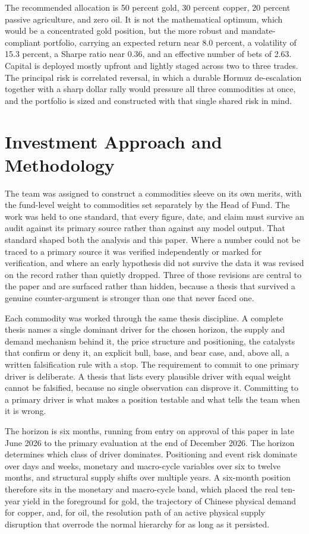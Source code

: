 \documentclass[11pt,a4paper]{article}
\begin{document}
The recommended allocation is 50 percent gold, 30 percent copper, 20 percent passive agriculture, and zero oil. It is not the mathematical optimum, which would be a concentrated gold position, but the more robust and mandate-compliant portfolio, carrying an expected return near 8.0 percent, a volatility of 15.3 percent, a Sharpe ratio near 0.36, and an effective number of bets of 2.63. Capital is deployed mostly upfront and lightly staged across two to three trades. The principal risk is correlated reversal, in which a durable Hormuz de-escalation together with a sharp dollar rally would pressure all three commodities at once, and the portfolio is sized and constructed with that single shared risk in mind.

\section{Investment Approach and Methodology}

The team was assigned to construct a commodities sleeve on its own merits, with the fund-level weight to commodities set separately by the Head of Fund. The work was held to one standard, that every figure, date, and claim must survive an audit against its primary source rather than against any model output. That standard shaped both the analysis and this paper. Where a number could not be traced to a primary source it was verified independently or marked for verification, and where an early hypothesis did not survive the data it was revised on the record rather than quietly dropped. Three of those revisions are central to the paper and are surfaced rather than hidden, because a thesis that survived a genuine counter-argument is stronger than one that never faced one.

Each commodity was worked through the same thesis discipline. A complete thesis names a single dominant driver for the chosen horizon, the supply and demand mechanism behind it, the price structure and positioning, the catalysts that confirm or deny it, an explicit bull, base, and bear case, and, above all, a written falsification rule with a stop. The requirement to commit to one primary driver is deliberate. A thesis that lists every plausible driver with equal weight cannot be falsified, because no single observation can disprove it. Committing to a primary driver is what makes a position testable and what tells the team when it is wrong.

The horizon is six months, running from entry on approval of this paper in late June 2026 to the primary evaluation at the end of December 2026. The horizon determines which class of driver dominates. Positioning and event risk dominate over days and weeks, monetary and macro-cycle variables over six to twelve months, and structural supply shifts over multiple years. A six-month position therefore sits in the monetary and macro-cycle band, which placed the real ten-year yield in the foreground for gold, the trajectory of Chinese physical demand for copper, and, for oil, the resolution path of an active physical supply disruption that overrode the normal hierarchy for as long as it persisted.
\end{document}

